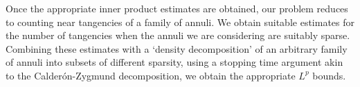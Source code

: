 \documentclass[11pt]{article}
\DeclareMathOperator{\RR}{\mathbb{R}}
\begin{document}
Once the appropriate inner product estimates are obtained, our problem reduces to counting near tangencies of a family of annuli. We obtain suitable estimates for the number of tangencies when the annuli we are considering are suitably sparse. Combining these estimates with a `density decomposition' of an arbitrary family of annuli into subsets of different sparsity, using a stopping time argument akin to the Calder\'{o}n-Zygmund decomposition, we obtain the appropriate $L^p$ bounds.


\end{document}
